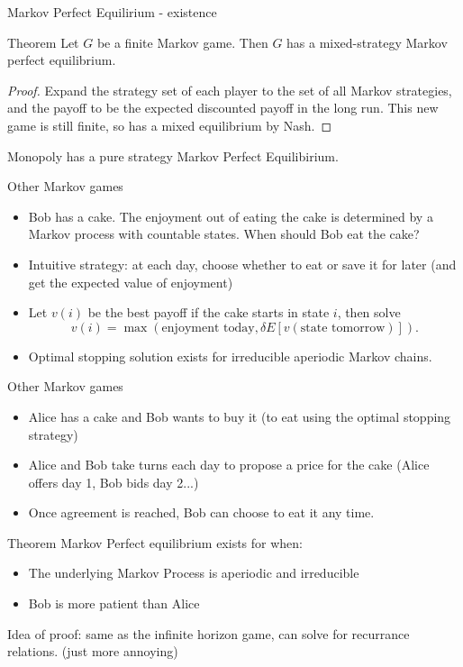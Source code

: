 \documentclass[aspectratio=169,xcolor=dvipsnames]{beamer}
\begin{document}
\begin{frame}{Markov Perfect Equilirium - existence}
    
    \begin{alertblock}{Theorem \cite{FT}}
    Let $G$ be a finite Markov game. Then $G$ has a mixed-strategy Markov perfect equilibrium.
    \end{alertblock}
    \begin{proof}
        Expand the strategy set of each player to the set of all Markov strategies, and the payoff to be the expected discounted payoff in the long run. This new game is still finite, so has a mixed equilibrium by Nash.
    \end{proof}
\begin{corollary}
    Monopoly has a pure strategy Markov Perfect Equilibirium.
\end{corollary}

\end{frame}
\begin{frame}{Other Markov games}
    \begin{itemize}
        \item 
        Bob has a cake. The enjoyment out of eating the cake is determined by a Markov process with countable states. When should Bob eat the cake?
        \item Intuitive strategy: at each day, choose whether to eat or save it for later (and get the expected value of enjoyment)
        \item Let $v(i)$ be the best payoff if the cake starts in state $i$, then solve \[
        v(i) = \max(\textrm{enjoyment today}, \delta E[v(\textrm{state tomorrow})]).
        \] 
        \item Optimal stopping solution exists for irreducible aperiodic Markov chains.
    \end{itemize}
\end{frame}

\begin{frame}{Other Markov games \cite{Cripps1998}}
    \begin{itemize}
        \item Alice has a cake and Bob wants to buy it (to eat using the optimal stopping strategy)
        \item Alice and Bob take turns each day to propose a price for the cake (Alice offers day 1, Bob bids day 2...)
        \item Once agreement is reached, Bob can choose to eat it any time.
    \end{itemize}
    \begin{alertblock}{Theorem }
        Markov Perfect equilibrium exists for when: \begin{itemize}
            \item The underlying Markov Process is aperiodic and irreducible
            \item Bob is more patient than Alice
        \end{itemize}
        \end{alertblock}
        Idea of proof: same as the infinite horizon game, can solve for recurrance relations. (just more annoying)
\end{frame}
\end{document}

